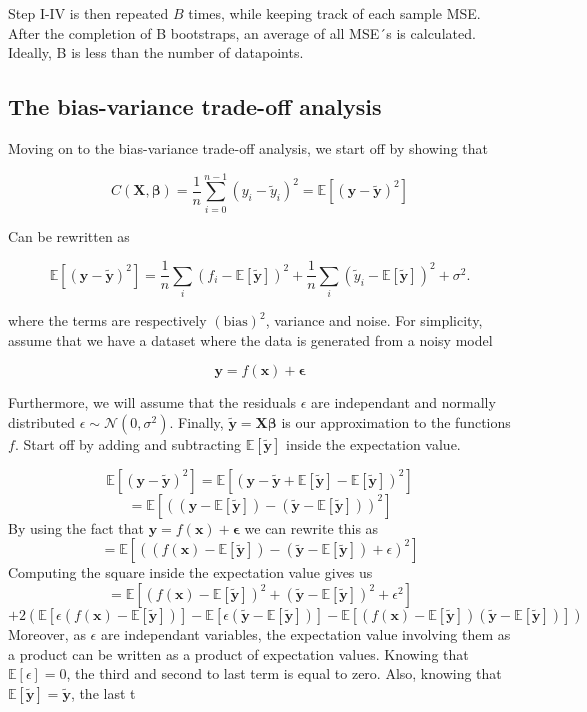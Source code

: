 \documentclass[11pt, a4paper]{article}
\begin{document}
Step I-IV is then repeated $B$ times, while keeping track of each sample MSE. After the completion of B bootstraps, an average of all MSE´s is calculated. Ideally, B is less than the number of datapoints.


\subsection*{The bias-variance trade-off analysis}

Moving on to the bias-variance trade-off analysis, we start off by showing that

\[
  C(\bm{X},\bm{\beta}) =\frac{1}{n}\sum_{i=0}^{n-1}(y_i-\tilde{y}_i)^2=\mathbb{E}\left[(\bm{y}-\bm{\tilde{y}})^2\right]
\]

Can be rewritten as

\[
  \mathbb{E}\left[(\bm{y}-\bm{\tilde{y}})^2\right]=\frac{1}{n}\sum_i(f_i-\mathbb{E}\left[\bm{\tilde{y}}\right])^2+\frac{1}{n}\sum_i(\tilde{y}_i-\mathbb{E}\left[\bm{\tilde{y}}\right])^2+\sigma^2.
\]

where the terms are respectively $(\text{bias})^2$, variance and noise. For simplicity, assume that we have a dataset where the data is generated from a noisy model

\[\bm{y} = f(\bm{x}) + \bm{\epsilon}\]

Furthermore, we will assume that the residuals $\epsilon$ are independant and normally distributed $\epsilon \sim \mathcal{N}(0, \sigma^2)$. Finally, $\bm{\tilde{y}} = \bm{X}\bm{\beta}$ is our approximation to the functions $f$. Start off by adding and subtracting $\mathbb{E}\left[\bm{\tilde{y}}\right]$ inside the expectation value.

\[
  \mathbb{E}\left[(\bm{y}-\bm{\tilde{y}})^2\right]
  = \mathbb{E}\left[(\bm{y}-\bm{\tilde{y}} + \mathbb{E}\left[\bm{\tilde{y}}\right] - \mathbb{E}\left[\bm{\tilde{y}}\right])^2\right]
\]
\[
  = \mathbb{E}\left[((\bm{y} - \mathbb{E}\left[\bm{\tilde{y}}\right]) - (\bm{\tilde{y}} - \mathbb{E}\left[\bm{\tilde{y}}\right]))^2\right]
\]
By using the fact that $\bm{y} = f(\bm{x}) + \bm{\epsilon}$
we can rewrite this as
\[
  = \mathbb{E}\left[((f(\bm{x}) - \mathbb{E}\left[\bm{\tilde{y}}\right]) - (\bm{\tilde{y}} - \mathbb{E}\left[\bm{\tilde{y}}\right]) + \epsilon)^2\right]
\]
Computing the square inside the expectation value gives us
\[
  = \mathbb{E}\left[(f(\bm{x}) - \mathbb{E}\left[\bm{\tilde{y}}\right])^2 + (\bm{\tilde{y}} - \mathbb{E}\left[\bm{\tilde{y}}\right])^2 + \epsilon^2 \right]\]
\[+ 2\left(\mathbb{E}\left[\epsilon(f(\bm{x}) - \mathbb{E}\left[\bm{\tilde{y}}\right])\right]- \mathbb{E}\left[\epsilon(\bm{\tilde{y}} - \mathbb{E}\left[\bm{\tilde{y}}\right])\right] - \mathbb{E}\left[(f(\bm{x}) - \mathbb{E}\left[\bm{\tilde{y}}\right])(\bm{\tilde{y}} - \mathbb{E}\left[\bm{\tilde{y}}\right])\right]\right)
\]
Moreover, as $\epsilon$ are independant variables, the expectation value involving them as a product can be written as a product of expectation values. Knowing that $\mathbb{E}\left[\epsilon\right] = 0$, the third and second to last term is equal to zero. Also, knowing that $\mathbb{E}\left[\bm{\tilde{y}}\right] = \bm{\tilde{y}}$, the last t
\end{document}
